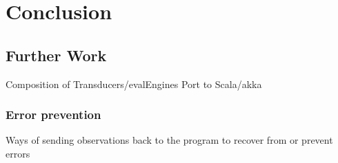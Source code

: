 %
\chapter{Conclusion}
\label{sec:conclusion}

\section{Further Work}
\label{sec:conclusion:further_work}

Composition of Transducers/evalEngines
Port to Scala/akka

\subsection{Error prevention}
\label{sec:conclusion:further_work:error_prevention}
Ways of sending observations back to the program to recover from or prevent errors

